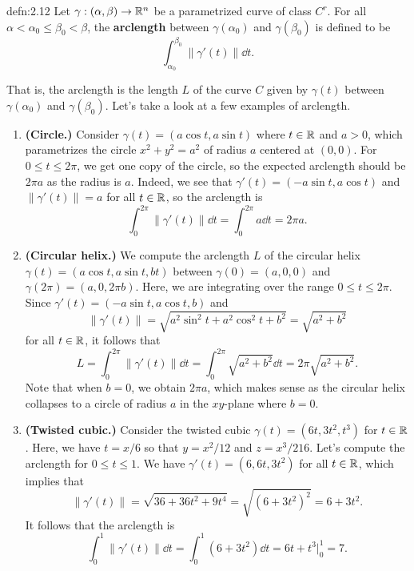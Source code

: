 \begin{defn}{defn:2.12}
    Let $\gamma : (\alpha, \beta) \to \mathbb{R}^n$ be a parametrized curve of class 
    $C^r$. For all $\alpha < \alpha_0 \leq \beta_0 < \beta$, the 
    {\bf arclength} between $\gamma(\alpha_0)$ and $\gamma(\beta_0)$ is 
    defined to be 
    \[ \int_{\alpha_0}^{\beta_0} \|\gamma'(t)\|\dd t. \] 
\end{defn}\vspace{-0.25cm}
That is, the arclength is the length $L$ of the curve $C$ given by $\gamma(t)$ 
between $\gamma(\alpha_0)$ and $\gamma(\beta_0)$.
Let's take a look at a few examples of arclength. 

\begin{enumerate}[(1)]
    \item {\bf (Circle.)} Consider $\gamma(t) = (a\cos t, a\sin t)$ where 
    $t \in \mathbb{R}$ and $a > 0$, which parametrizes the circle $x^2 + y^2 = a^2$ 
    of radius $a$ centered at $(0, 0)$. For $0 \leq t \leq 2\pi$, 
    we get one copy of the circle, so the expected arclength 
    should be $2\pi a$ as the radius is $a$. Indeed, we see that $\gamma'(t) 
    = (-a\sin t, a\cos t)$ and $\|\gamma'(t)\| = a$ for all $t \in \mathbb{R}$, so the arclength is 
    \[ \int_0^{2\pi} \|\gamma'(t)\|\dd t = \int_0^{2\pi} a\dd t = 2\pi a. \] 

    \item {\bf (Circular helix.)} We compute the arclength $L$ of the 
    circular helix $\gamma(t) = (a\cos t, a\sin t, bt)$ between 
    $\gamma(0) = (a, 0, 0)$ and $\gamma(2\pi) = (a, 0, 2\pi b)$.
    Here, we are integrating over the range $0 \leq t \leq 2\pi$. 
    Since $\gamma'(t) = (-a\sin t, a\cos t, b)$ and 
    \[ \|\gamma'(t)\| = \sqrt{a^2\sin^2 t + a^2\cos^2 t + b^2} = \sqrt{a^2+b^2} \] 
    for all $t \in \mathbb{R}$, it follows that 
    \[ L = \int_0^{2\pi} \|\gamma'(t)\|\dd t 
    = \int_0^{2\pi} \sqrt{a^2+b^2}\dd t = 2\pi\sqrt{a^2+b^2}. \] 
    Note that when $b = 0$, we obtain $2\pi a$, which makes sense as 
    the circular helix collapses to a circle of radius $a$ in the $xy$-plane
    where $b = 0$.

    \item {\bf (Twisted cubic.)} Consider the twisted cubic 
    $\gamma(t) = (6t, 3t^2, t^3)$ for $t \in \mathbb{R}$. Here, we have 
    $t = x/6$ so that $y = x^2/12$ and $z = x^3/216$. Let's compute 
    the arclength for $0 \leq t \leq 1$. We have $\gamma'(t) = (6, 6t, 3t^2)$
    for all $t \in \mathbb{R}$, which implies that 
    \[ \|\gamma'(t)\| = \sqrt{36+36t^2+9t^4} = \sqrt{(6+3t^2)^2} = 6 + 3t^2. \] 
    It follows that the arclength is 
    \[ \int_0^1 \|\gamma'(t)\|\dd t = \int_0^1 (6 + 3t^2)\dd t 
    = 6t + t^3 \Big|_0^1 = 7. \] 
\end{enumerate}


